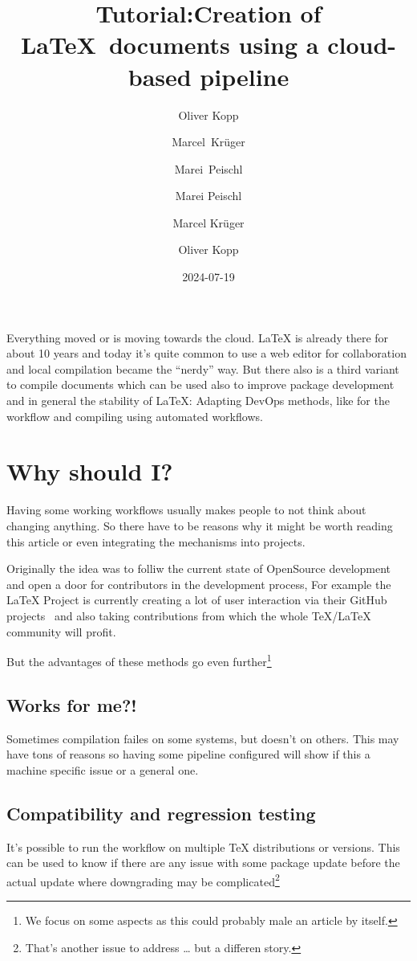 \documentclass[final]{ltugboat}
\title[TUG2024: LaTeX CI/CD]{Tutorial:\newline Creation of \LaTeX\ documents using a cloud-based pipeline}
\date{2024-07-19}
\author{Oliver Kopp \and Marcel~Krüger \and Marei~Peischl}
\author{Marei Peischl}
\author{Marcel Krüger}
\author{Oliver Kopp}
\begin{document}
\maketitle

Everything moved or is moving towards the cloud.
\LaTeX{} is already there for about 10 years and today it's quite common to use a web editor for collaboration and local compilation became the \enquote{nerdy} way.
But there also is a third variant to compile documents which can be used also to improve package development and in general the stability of \LaTeX{}:
Adapting DevOps methods, like  for the workflow and compiling using automated workflows. 

\section{Why should I?}
Having some working workflows usually makes people to not think about changing anything.
So there have to be reasons why it might be worth reading this article or even integrating the mechanisms into projects.

Originally the idea was to folliw the current state of OpenSource development and open a door for contributors in the development process, 
For example the \LaTeX{} Project is currently creating a lot of user interaction via their GitHub projects~\cite{latex3-github} and also taking contributions from which the whole \TeX/\LaTeX{} community will profit.

But the advantages of these methods go even further\footnote{We focus on some aspects as this could probably male an article by itself.}

\subsection{Works for me?!}
Sometimes compilation failes on some systems, but doesn't on others. 
This may have tons of reasons so having some pipeline configured will show if this a machine specific issue or a general one. 

\subsection{Compatibility and regression testing}
It's possible to run the workflow on multiple TeX distributions or versions.
This can be used to know if there are any issue with some package update before the actual update where downgrading may be complicated\footnote{That's another issue to address … but a differen story.}
\end{document}
